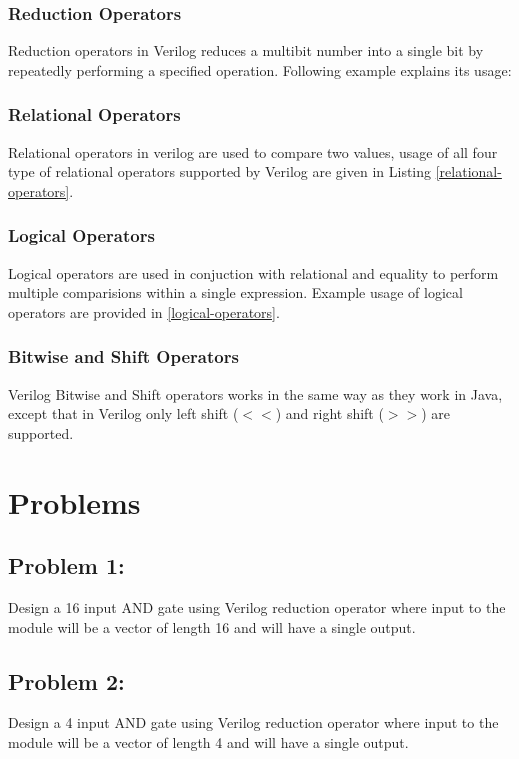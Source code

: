 \documentclass[a4paper,10pt]{article}
\theoremstyle{mytheor}
\newcommand{
  \insertverilog}[3]{
  
}
\begin{document}
\subsubsection*{Reduction Operators}
Reduction operators in Verilog reduces a multibit number into a single
bit by repeatedly performing a specified operation. Following example 
explains its usage: 
\insertverilog{./verilog_files/reductionOperators.v}{reduction-operators}{\text{Functioning of reduction operator}}
 
\subsubsection*{Relational Operators}
Relational operators in verilog are used to compare two values, usage
of all four type of relational operators supported by Verilog are
given in Listing \ref{relational-operators}.
\insertverilog{./verilog_files/relationalOperators.v}{relational-operators}{\text{Functioning of relational operator}}
  
\subsubsection*{Logical Operators}
Logical operators are used in conjuction with relational and equality
to perform multiple comparisions within a single expression.
Example usage of logical operators are provided in \ref{logical-operators}.
\insertverilog{./verilog_files/logicalOperators.v}{logical-operators}{\text{Functioning of logical operator}}

\subsubsection*{Bitwise and Shift Operators}
Verilog Bitwise and Shift operators works in the same way as they work
in Java, except that in Verilog only left shift ($<<$) and right shift
($>>$) are supported.

\section*{Problems}
\subsection*{Problem 1:}
Design a 16 input AND gate using Verilog reduction operator where input to the module will be a vector of length 16 and will have a single output.
\subsection*{Problem 2:}
Design a 4 input AND gate using Verilog reduction operator where input to the module will be a vector of length 4 and will have a single output.
\end{document}
